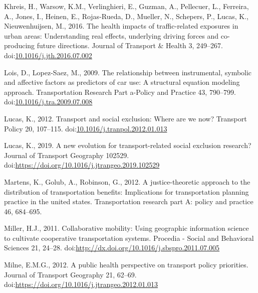 \documentclass[]{elsarticle} %
\begin{document}
\leavevmode\hypertarget{ref-Khreis2016health}{}%
Khreis, H., Warsow, K.M., Verlinghieri, E., Guzman, A., Pellecuer, L.,
Ferreira, A., Jones, I., Heinen, E., Rojas-Rueda, D., Mueller, N.,
Schepers, P., Lucas, K., Nieuwenhuijsen, M., 2016. The health impacts of
traffic-related exposures in urban areas: Understanding real effects,
underlying driving forces and co-producing future directions. Journal of
Transport \& Health 3, 249--267.
doi:\href{https://doi.org/10.1016/j.jth.2016.07.002}{10.1016/j.jth.2016.07.002}

\leavevmode\hypertarget{ref-Lois2009relationship}{}%
Lois, D., Lopez-Saez, M., 2009. The relationship between instrumental,
symbolic and affective factors as predictors of car use: A structural
equation modeling approach. Transportation Research Part a-Policy and
Practice 43, 790--799.
doi:\href{https://doi.org/10.1016/j.tra.2009.07.008}{10.1016/j.tra.2009.07.008}

\leavevmode\hypertarget{ref-Lucas2012transport}{}%
Lucas, K., 2012. Transport and social exclusion: Where are we now?
Transport Policy 20, 107--115.
doi:\href{https://doi.org/10.1016/j.tranpol.2012.01.013}{10.1016/j.tranpol.2012.01.013}

\leavevmode\hypertarget{ref-Lucas2019evolution}{}%
Lucas, K., 2019. A new evolution for transport-related social exclusion
research? Journal of Transport Geography 102529.
doi:\href{https://doi.org/https://doi.org/10.1016/j.jtrangeo.2019.102529}{https://doi.org/10.1016/j.jtrangeo.2019.102529}

\leavevmode\hypertarget{ref-Martens2012justice}{}%
Martens, K., Golub, A., Robinson, G., 2012. A justice-theoretic approach
to the distribution of transportation benefits: Implications for
transportation planning practice in the united states. Transportation
research part A: policy and practice 46, 684--695.

\leavevmode\hypertarget{ref-Miller2011collaborative}{}%
Miller, H.J., 2011. Collaborative mobility: Using geographic information
science to cultivate cooperative transportation systems. Procedia -
Social and Behavioral Sciences 21, 24--28.
doi:\href{https://doi.org/http://dx.doi.org/10.1016/j.sbspro.2011.07.005}{http://dx.doi.org/10.1016/j.sbspro.2011.07.005}

\leavevmode\hypertarget{ref-Milne2012public}{}%
Milne, E.M.G., 2012. A public health perspective on transport policy
priorities. Journal of Transport Geography 21, 62--69.
doi:\href{https://doi.org/https://doi.org/10.1016/j.jtrangeo.2012.01.013}{https://doi.org/10.1016/j.jtrangeo.2012.01.013}
\end{document}
